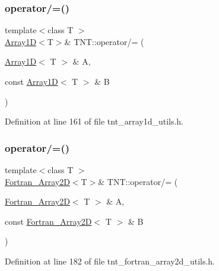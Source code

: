 \subsubsection{\texorpdfstring{operator/=()}{operator/=()}\hspace{0.1cm}{\footnotesize\ttfamily [1/5]}}
{\footnotesize\ttfamily template$<$class T $>$ \\
\hyperlink{classTNT_1_1Array1D}{Array1D}$<$T$>$\& T\+N\+T\+::operator/= (\begin{DoxyParamCaption}\item[{\hyperlink{classTNT_1_1Array1D}{Array1D}$<$ T $>$ \&}]{A,  }\item[{const \hyperlink{classTNT_1_1Array1D}{Array1D}$<$ T $>$ \&}]{B }\end{DoxyParamCaption})}



Definition at line 161 of file tnt\+\_\+array1d\+\_\+utils.\+h.

\mbox{\label{namespaceTNT_ad8d57784747776274490334a387b5eb4}} 
\subsubsection{\texorpdfstring{operator/=()}{operator/=()}\hspace{0.1cm}{\footnotesize\ttfamily [2/5]}}
{\footnotesize\ttfamily template$<$class T $>$ \\
\hyperlink{classTNT_1_1Fortran__Array2D}{Fortran\+\_\+\+Array2D}$<$T$>$\& T\+N\+T\+::operator/= (\begin{DoxyParamCaption}\item[{\hyperlink{classTNT_1_1Fortran__Array2D}{Fortran\+\_\+\+Array2D}$<$ T $>$ \&}]{A,  }\item[{const \hyperlink{classTNT_1_1Fortran__Array2D}{Fortran\+\_\+\+Array2D}$<$ T $>$ \&}]{B }\end{DoxyParamCaption})}



Definition at line 182 of file tnt\+\_\+fortran\+\_\+array2d\+\_\+utils.\+h.

\mbox{\label{namespaceTNT_adc8dc2db8d115a87af465d1d502bece1}} 

